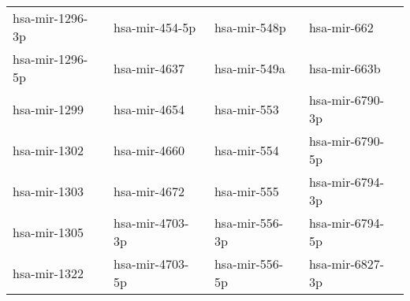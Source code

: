 \begin{table}
\begin{tabular}{|l|l|l|l|}
  hsa-mir-1296-3p & hsa-mir-454-5p & hsa-mir-548p & hsa-mir-662 \\ 
  hsa-mir-1296-5p & hsa-mir-4637 & hsa-mir-549a & hsa-mir-663b \\ 
  hsa-mir-1299 & hsa-mir-4654 & hsa-mir-553 & hsa-mir-6790-3p \\ 
  hsa-mir-1302 & hsa-mir-4660 & hsa-mir-554 & hsa-mir-6790-5p \\ 
  hsa-mir-1303 & hsa-mir-4672 & hsa-mir-555 & hsa-mir-6794-3p \\ 
  hsa-mir-1305 & hsa-mir-4703-3p & hsa-mir-556-3p & hsa-mir-6794-5p \\ 
  hsa-mir-1322 & hsa-mir-4703-5p & hsa-mir-556-5p & hsa-mir-6827-3p \\ 
   \hline
\end{tabular}
\vfill
\end{table}

